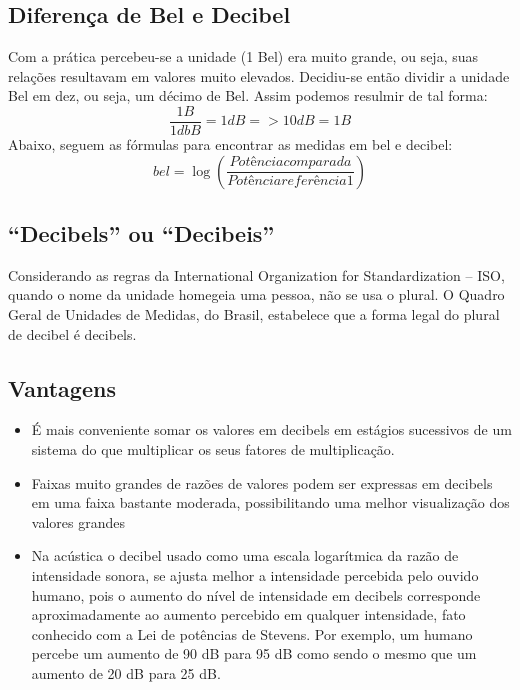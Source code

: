 \documentclass[
	article,			%
	11pt,				%
	oneside,			%
	a4paper,			%
	english,			%
	brazil,				%
	sumario=tradicional
	]{abntex2}
\begin{document}
\subsection{Diferença de Bel e Decibel}
Com a prática percebeu-se a unidade (1 Bel) era muito grande, ou seja, suas relações resultavam em valores muito elevados.
Decidiu-se então dividir a unidade Bel em dez, ou seja, um décimo de Bel.
Assim podemos resulmir de tal forma: 
\begin{equation}
    \frac{1B}{1dbB}= 1dB => 10dB = 1B
\end{equation}
Abaixo, seguem as fórmulas para encontrar as medidas em bel e decibel:
\begin{equation}
    bel = \log(\frac{Potência  comparada}{Potência referência1})
\end{equation}
\subsection{“Decibels” ou “Decibeis”}
Considerando as regras da International Organization for Standardization – ISO, quando o nome da unidade homegeia uma pessoa, não se usa o plural.
O Quadro Geral de Unidades de Medidas, do Brasil, estabelece que a forma legal do plural de decibel é decibels.
\subsection{Vantagens}
\begin{itemize}
    \item É mais conveniente somar os valores em decibels em estágios sucessivos de um sistema do que multiplicar os seus fatores de multiplicação.
    \item Faixas muito grandes de razões de valores podem ser expressas em decibels em uma faixa bastante moderada, possibilitando uma melhor visualização dos valores grandes
    \item Na acústica o decibel usado como uma escala logarítmica da razão de intensidade sonora, se ajusta melhor a intensidade percebida pelo ouvido humano, pois o aumento do nível de intensidade em decibels corresponde aproximadamente ao aumento percebido em qualquer intensidade, fato conhecido com a Lei de potências de Stevens. Por exemplo, um humano percebe um aumento de 90 dB para 95 dB como sendo o mesmo que um aumento de 20 dB para 25 dB.
    
\end{itemize}
    
\end{document}
